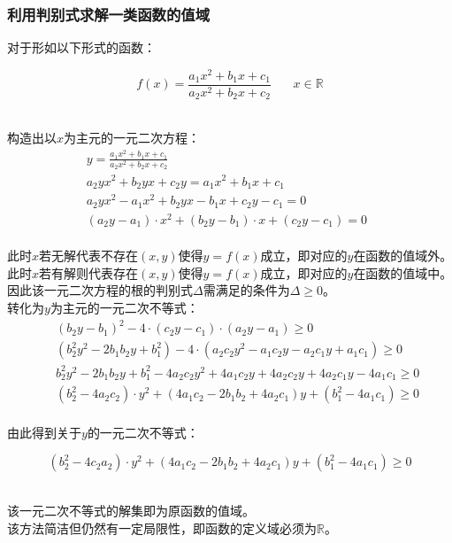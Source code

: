 \documentclass[UTF8]{ctexart}
\begin{document}
\newpage

\subsubsection{利用判别式求解一类函数的值域}
    \setcounter{equation}{0}
    对于形如以下形式的函数：
    \begin{large}
        \begin{equation*}
            f(x)=\frac{a_1x^2+b_1x+c_1}{a_2x^2+b_2x+c_2}~~~~~~~~x\in\mathbb{R}
        \end{equation*}
    \end{large}\\
    构造出以$x$为主元的一元二次方程：\vspace{3pt}
    \begin{align}
        &y=\frac{a_1x^2+b_1x+c_1}{a_2x^2+b_2x+c_2}\\[6mm]
        &a_2yx^2+b_2yx+c_2y=a_1x^2+b_1x+c_1\\[6mm]
        &a_2yx^2-a_1x^2+b_2yx-b_1x+c_2y-c_1=0\\[6mm]
        &(a_2y-a_1)\cdot x^2+(b_2y-b_1)\cdot x+(c_2y-c_1)=0~~~~~~
    \end{align}\\
    此时$x$若无解代表不存在$(x,y)$使得$y=f(x)$成立，即对应的$y$在函数的值域外。\\[3mm]
    此时$x$若有解则代表存在$(x,y)$使得$y=f(x)$成立，即对应的$y$在函数的值域中。\\[3mm]
    因此该一元二次方程的根的判别式$\Delta$需满足的条件为$\Delta\geq 0$。\\[8mm]
    转化为$y$为主元的一元二次不等式：
    \begin{align}
        &~~(b_2y-b_1)^2-4\cdot(c_2y-c_1)\cdot(a_2y-a_1)\geq 0\\[6mm]
        &~~(b_2^2y^2-2b_1b_2y+b_1^2)-4\cdot(a_2c_2y^2-a_1c_2y-a_2c_1y+a_1c_1)\geq 0\\[6mm]
        &~~b_2^2y^2-2b_1b_2y+b_1^2-4a_2c_2y^2+4a_1c_2y+4a_2c_2y+4a_2c_1y-4a_1c_1\geq 0\\[6mm]
        &~~(b_2^2-4a_2c_2)\cdot y^2+(4a_1c_2-2b_1b_2+4a_2c_1)y+(b_1^2-4a_1c_1)\geq 0
    \end{align}\\
    由此得到关于$y$的一元二次不等式：\vspace{3pt}
    \begin{large}
        \begin{equation*}
            (b_2^2-4c_2a_2)\cdot y^2+(4a_1c_2-2b_1b_2+4a_2c_1)y+(b_1^2-4a_1c_1)\geq 0    
        \end{equation*}
    \end{large}\\
    该一元二次不等式的解集即为原函数的值域。\\[3mm]
    该方法简洁但仍然有一定局限性，即函数的定义域必须为$\mathbb{R}$。
\end{document}
